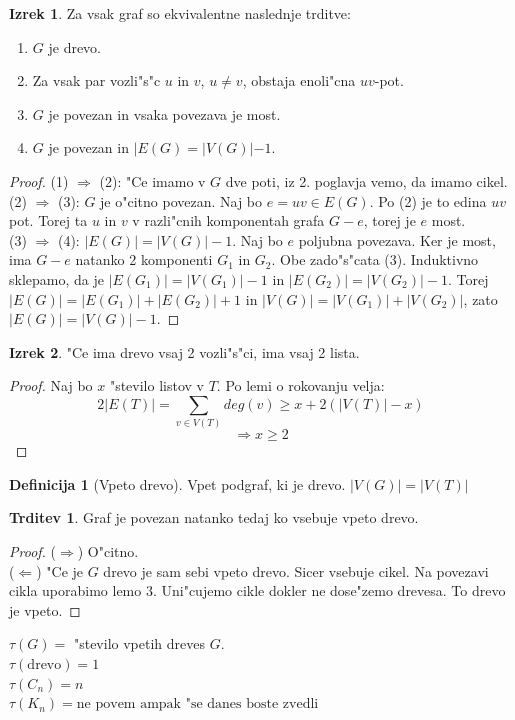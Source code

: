 \documentclass{article}
\theoremstyle{definition}
\newtheorem{definition}{Definicija}[section]
\newtheorem{claim}{Trditev}[section]
\newtheorem{theorem}{Izrek}[section]
\begin{document}
	\begin{theorem}
		Za vsak graf so ekvivalentne naslednje trditve:
		\begin{enumerate}
			\item $G$ je drevo.
			\item Za vsak par vozli"s"c $u$ in $v$, $u \neq v$, obstaja enoli"cna $uv$-pot.
			\item $G$ je povezan in vsaka povezava je most.
			\item $G$ je povezan in $|E(G) = |V(G)| - 1$.
		\end{enumerate}
		\begin{proof}
			(1) $\Rightarrow$ (2): "Ce imamo v $G$ dve poti, iz 2. poglavja vemo, da imamo cikel. \\
			(2) $\Rightarrow$ (3): $G$ je o"citno povezan. Naj bo $e = uv \in E(G)$. Po (2) je to edina $uv$ pot. Torej ta $u$ in $v$ v razli"cnih komponentah grafa $G-e$, torej je $e$ most. \\
			(3) $\Rightarrow$ (4): $|E(G)| = |V(G)|-1$. Naj bo $e$ poljubna povezava. Ker je most, ima $G-e$ natanko 2 komponenti $G_1$ in $G_2$. Obe zado"s"cata (3). Induktivno sklepamo, da je $|E(G_1)| = |V(G_1)|-1$ in $|E(G_2)| = |V(G_2)|-1$. Torej $|E(G)| = |E(G_1)| + |E(G_2)| + 1$ in $|V(G)| = |V(G_1)| + |V(G_2)|$, zato $|E(G)| = |V(G)| - 1$.
		\end{proof}
	\end{theorem}

	\begin{theorem}
		"Ce ima drevo vsaj 2 vozli"s"ci, ima vsaj 2 lista.
		\begin{proof}
			Naj bo $x$ "stevilo listov v $T$. Po lemi o rokovanju velja:
			$$ 2|E(T)| = \sum_{v \in V(T)}deg(v) \geq x + 2(|V(T)| - x) $$
			$$\Rightarrow x \geq 2$$
		\end{proof}
	\end{theorem}

	\begin{definition}[Vpeto drevo]
		Vpet podgraf, ki je drevo.
		$|V(G)| = |V(T)|$
	\end{definition}
	\begin{claim}
		Graf je povezan natanko tedaj ko vsebuje vpeto drevo.
		\begin{proof}
			($\Rightarrow$) O"citno. \\
			($\Leftarrow$) "Ce je $G$ drevo je sam sebi vpeto drevo. Sicer vsebuje cikel. Na povezavi cikla uporabimo lemo 3. Uni"cujemo cikle dokler ne dose"zemo drevesa. To drevo je vpeto.
		\end{proof}
	\end{claim}
	$\tau(G) = $ "stevilo vpetih dreves $G$. \\
	$\tau(\text{drevo}) = 1$ \\
	$\tau(C_n) = n$ \\
	$\tau(K_n) = \text{ne povem ampak "se danes boste zvedli }$ %
	
\end{document}
